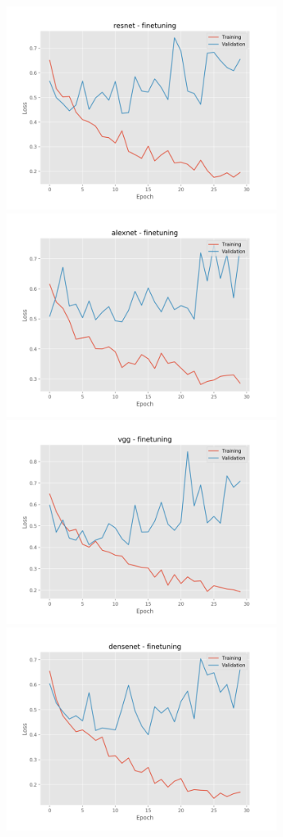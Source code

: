 \documentclass[]{kththesis}
\begin{document}
  \begin{figure}[h]
    \includegraphics[width=9cm]{f_l_resnet_fine}
    \includegraphics[width=9cm]{f_l_alexnet_fine}
    \includegraphics[width=9cm]{f_l_vgg_fine}
    \includegraphics[width=9cm]{f_l_densenet_fine}

\end{figure}
\end{document}
